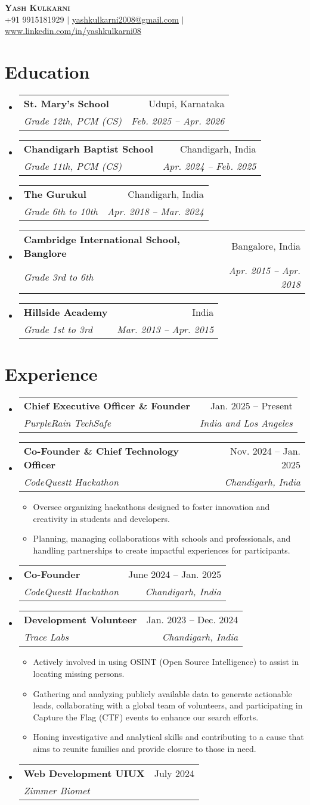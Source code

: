 \documentclass[letterpaper,11pt]{article}
\makeatletter
\newcommand{\resumeItem}[1]{
  \item\small{
    {#1 \vspace{-2pt}}
  }
}
\newcommand{\resumeSubheading}[4]{
  \vspace{-2pt}\item
    \begin{tabular*}{0.97\textwidth}[t]{l@{\extracolsep{\fill}}r}
      \textbf{#1} & #2 \\
      \textit{\small#3} & \textit{\small #4} \\
    \end{tabular*}\vspace{-7pt}
}
\newcommand{\resumeSubHeadingListStart}{\begin{itemize}[leftmargin=0.15in, label={}]}
\newcommand{\resumeSubHeadingListEnd}{\end{itemize}}
\newcommand{\resumeItemListStart}{\begin{itemize}}
\newcommand{\resumeItemListEnd}{\end{itemize}\vspace{-5pt}}
\makeatother
\begin{document}
\begin{center}
    \textbf{\Huge \scshape Yash Kulkarni} \\ \vspace{1pt}
    \small +91 9915181929 $|$ \href{mailto:yashkulkarni2008@gmail.com}{\underline{yashkulkarni2008@gmail.com}} $|$
    \href{www.linkedin.com/in/yashkulkarni08}{\underline{www.linkedin.com/in/yashkulkarni08}}
\end{center}


\section{Education}
  \resumeSubHeadingListStart
    \resumeSubheading
      {St. Mary's School}{Udupi, Karnataka}
      {Grade 12th, PCM (CS)}{Feb. 2025 -- Apr. 2026}
    \resumeSubheading
      {Chandigarh Baptist School}{Chandigarh, India}
      {Grade 11th, PCM (CS)}{Apr. 2024 -- Feb. 2025}
    \resumeSubheading
      {The Gurukul}{Chandigarh, India}
      {Grade 6th to 10th}{Apr. 2018 -- Mar. 2024}
    \resumeSubheading
      {Cambridge International School, Banglore}{Bangalore, India}
      {Grade 3rd to 6th}{Apr. 2015 -- Apr. 2018}
    \resumeSubheading
      {Hillside Academy}{India}
      {Grade 1st to 3rd}{Mar. 2013 -- Apr. 2015}
  \resumeSubHeadingListEnd


\section{Experience}
  \resumeSubHeadingListStart
    \resumeSubheading
      {Chief Executive Officer \& Founder}{Jan. 2025 -- Present}
      {PurpleRain TechSafe}{India and Los Angeles}
    \resumeSubheading
      {Co-Founder \& Chief Technology Officer}{Nov. 2024 -- Jan. 2025}
      {CodeQuestt Hackathon}{Chandigarh, India}
      \resumeItemListStart
        \resumeItem{Oversee organizing hackathons designed to foster innovation and creativity in students and developers.}
        \resumeItem{Planning, managing collaborations with schools and professionals, and handling partnerships to create impactful experiences for participants.}
      \resumeItemListEnd
    \resumeSubheading
      {Co-Founder}{June 2024 -- Jan. 2025}
      {CodeQuestt Hackathon}{Chandigarh, India}
    \resumeSubheading
      {Development Volunteer}{Jan. 2023 -- Dec. 2024}
      {Trace Labs}{Chandigarh, India}
      \resumeItemListStart
        \resumeItem{Actively involved in using OSINT (Open Source Intelligence) to assist in locating missing persons.}
        \resumeItem{Gathering and analyzing publicly available data to generate actionable leads, collaborating with a global team of volunteers, and participating in Capture the Flag (CTF) events to enhance our search efforts.}
        \resumeItem{Honing investigative and analytical skills and contributing to a cause that aims to reunite families and provide closure to those in need.}
      \resumeItemListEnd
    \resumeSubheading
      {Web Development UI\/UX}{July 2024}
      {Zimmer Biomet}{}
  \resumeSubHeadingListEnd
\end{document}
